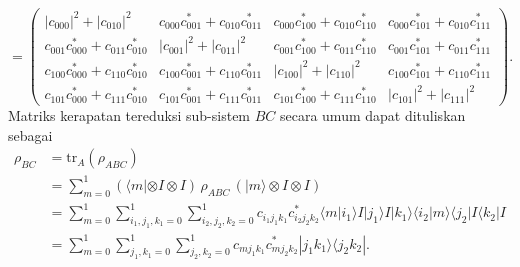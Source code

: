\begin{equation}
	=
	\begin{pmatrix}
		|c_{000}|^2+|c_{010}|^2 &
		c_{000}c_{001}^{*}+c_{010}c_{011}^{*} &
		c_{000}c_{100}^{*}+c_{010}c_{110}^{*} &
		c_{000}c_{101}^{*}+c_{010}c_{111}^{*}
		\\[0.3em]
		c_{001}c_{000}^{*}+c_{011}c_{010}^{*} &
		|c_{001}|^2+|c_{011}|^2 &
		c_{001}c_{100}^{*}+c_{011}c_{110}^{*} &
		c_{001}c_{101}^{*}+c_{011}c_{111}^{*}
		\\[0.3em]
		c_{100}c_{000}^{*}+c_{110}c_{010}^{*} &
		c_{100}c_{001}^{*}+c_{110}c_{011}^{*} &
		|c_{100}|^2+|c_{110}|^2 &
		c_{100}c_{101}^{*}+c_{110}c_{111}^{*}
		\\[0.3em]
		c_{101}c_{000}^{*}+c_{111}c_{010}^{*} &
		c_{101}c_{001}^{*}+c_{111}c_{011}^{*} &
		c_{101}c_{100}^{*}+c_{111}c_{110}^{*} &
		|c_{101}|^2+|c_{111}|^2
	\end{pmatrix}.
\end{equation}
Matriks kerapatan tereduksi sub-sistem $BC$ secara umum dapat dituliskan sebagai
\begin{align}
	\rho_{BC} &= \mathrm{tr}_A(\rho_{ABC}) \nonumber \\
	&= \sum_{m=0}^{1} (\langle m| \otimes I \otimes I)\, \rho_{ABC}\, (|m\rangle \otimes I \otimes I) \nonumber \\
	&= \sum_{m=0}^{1} \sum_{i_1,j_1,k_1=0}^{1} \sum_{i_2,j_2,k_2=0}^{1}
	c_{i_1 j_1 k_1}c^{*}_{i_2 j_2 k_2}
	\langle m|i_1\rangle I |j_1\rangle I |k_1\rangle
	\langle i_2|m\rangle \langle j_2| I \langle k_2| I \nonumber \\
	&= \sum_{m=0}^{1} \sum_{j_1,k_1=0}^{1} \sum_{j_2,k_2=0}^{1}
	c_{m j_1 k_1}c^{*}_{m j_2 k_2}
	|j_1 k_1\rangle \langle j_2 k_2|\label{rhoBC3qubit}.
\end{align}

